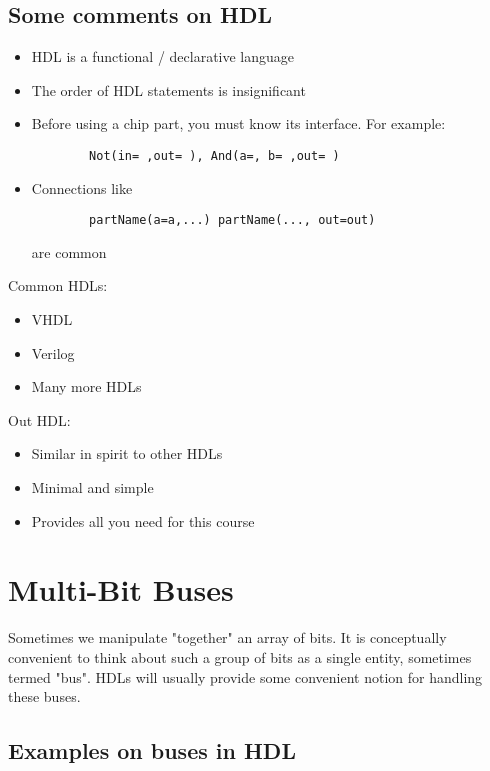 \subsection{Some comments on HDL}

\begin{itemize}
    \item HDL is a functional / declarative language
    \item The order of HDL statements is insignificant
    \item Before using a chip part, you must know its interface.
        For example: 
        \begin{lstlisting}
        Not(in= ,out= ), And(a=, b= ,out= )
        \end{lstlisting}
    \item Connections like
        \begin{lstlisting}
        partName(a=a,...) partName(..., out=out)
        \end{lstlisting}
        are common
\end{itemize}

Common HDLs:

\begin{itemize}
    \item VHDL
    \item Verilog
    \item Many more HDLs
\end{itemize}

Out HDL:

\begin{itemize}
    \item Similar in spirit to other HDLs
    \item Minimal and simple
    \item Provides all you need for this course
\end{itemize}

\section{Multi-Bit Buses}

Sometimes we manipulate "together" an array of bits.
It is conceptually convenient to think about such a group of bits
as a single entity, sometimes termed "bus".
HDLs will usually provide some convenient notion for handling
these buses.

\subsection{Examples on buses in HDL}


